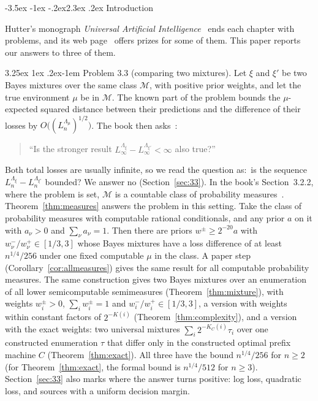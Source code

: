 \documentclass[11pt]{article}
\makeatletter
\renewcommand\section{\@startsection{section}{1}{\z@}%
  {-3.5ex \@plus -1ex \@minus -.2ex}{2.3ex \@plus.2ex}%
  {\normalfont\Large\bfseries\boldmath}}
\renewcommand\paragraph{\@startsection{paragraph}{4}{\z@}%
  {3.25ex \@plus1ex \@minus.2ex}{-1em}%
  {\normalfont\normalsize\bfseries\boldmath}}
\newcommand{\cM}{\mathcal{M}}
\theoremstyle{definition}
\theoremstyle{remark}
\makeatother
\begin{document}
\tableofcontents

\section{Introduction}

Hutter's monograph \emph{Universal Artificial Intelligence}~\cite{hutter2005uai}
ends each chapter with problems, and its web page~\cite{hutterprizepage} offers
prizes for some of them. This paper reports our answers to three of them.

\paragraph{Problem 3.3 (comparing two mixtures).}
Let $\xi$ and $\xi'$ be two Bayes mixtures over the same class $\cM$, with
positive prior weights, and let the true environment $\mu$ be in $\cM$. The
known part of the problem bounds the $\mu$-expected squared distance between
their predictions and the difference of their losses by
$O\bigl((L^{\Lambda_\mu}_n)^{1/2}\bigr)$. The book then asks~\cite[p.~120]{hutter2005uai}:
\begin{quote}
``Is the stronger result $L_\infty^{\Lambda_\xi}-L_\infty^{\Lambda_{\xi'}}<\infty$ also true?''
\end{quote}
Both total losses are usually infinite, so we read the question as:\ is the
sequence $L_n^{\Lambda_\xi}-L_n^{\Lambda_{\xi'}}$ bounded? We answer no
(Section~\ref{sec:33}). In the book's Section~3.2.2, where the problem is set,
$\cM$ is a countable class of probability measures~\cite[p.~70]{hutter2005uai}.
Theorem~\ref{thm:measures} answers the problem in this setting. Take the class
of probability measures with computable rational conditionals, and any prior
$a$ on it with $a_\nu>0$ and $\sum_\nu a_\nu=1$. Then there are priors
$w^\pm\ge2^{-20}a$ with $w^-_\nu/w^+_\nu\in[1/3,3]$ whose Bayes mixtures have a
loss difference of at least $n^{1/4}/256$ under one fixed computable $\mu$ in
the class. A paper step (Corollary~\ref{cor:allmeasures}) gives the same result
for all computable probability measures. The same construction gives two Bayes
mixtures over an enumeration of all lower semicomputable semimeasures
(Theorem~\ref{thm:mixture}), with weights $w^\pm_i>0$, $\sum_i w^\pm_i=1$ and
$w^-_i/w^+_i\in[1/3,3]$, a version with weights within constant factors of
$2^{-K(i)}$ (Theorem~\ref{thm:complexity}), and a version with the exact
weights: two universal mixtures $\sum_i2^{-K_C(i)}\tau_i$ over one constructed
enumeration $\tau$ that differ only in the constructed optimal prefix machine $C$
(Theorem~\ref{thm:exact}). All three have the bound $n^{1/4}/256$ for $n\ge2$
(for Theorem~\ref{thm:exact}, the formal bound is $n^{1/4}/512$ for $n\ge3$).
Section~\ref{sec:33} also marks where the answer turns positive: log loss,
quadratic loss, and sources with a uniform decision margin.
\end{document}
